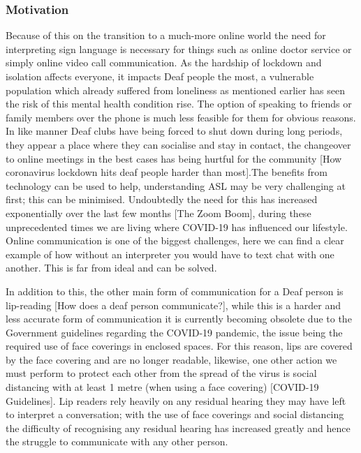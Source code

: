 \documentclass[10pt]{article}
\begin{document}
\subsubsection{Motivation}

Because of this on the transition to a much-more online world the need for interpreting sign 
language is necessary for things such as online doctor service or simply online video call 
communication. As the hardship of lockdown and isolation affects everyone, it impacts Deaf people 
the most, a vulnerable population which already suffered from loneliness as mentioned earlier has 
seen the risk of this mental health condition rise. The option of speaking to friends or family 
members over the phone is much less feasible for them for obvious reasons. In like manner Deaf clubs 
have being forced to shut down during long periods, they appear a place where they can socialise and 
stay in contact, the changeover to online meetings in the best cases has being hurtful for the 
community [How coronavirus lockdown hits deaf people harder than most].The benefits from technology 
can be used to help, understanding ASL may be very challenging at first; this can be minimised. 
Undoubtedly the need for this has increased exponentially over the last few months [The Zoom Boom], 
during these unprecedented times we are living where COVID-19 has influenced our lifestyle. Online 
communication is one of the biggest challenges, here we can find a clear example of how without an 
interpreter you would have to text chat with one another. This is far from ideal and can be solved. 

In addition to this, the other main form of communication for a Deaf person is lip-reading [How does 
a deaf person communicate?], while this is a harder and less accurate form of communication it is 
currently becoming obsolete due to the Government guidelines regarding the COVID-19 pandemic, the 
issue being the required use of face coverings in enclosed spaces. For this reason, lips are covered 
by the face covering and are no longer readable, likewise, one other action we must perform to 
protect each other from the spread of the virus is social distancing with at least 1 metre (when 
using a face covering) [COVID-19 Guidelines]. Lip readers rely heavily on any residual hearing they 
may have left to interpret a conversation; with the use of face coverings and social distancing the 
difficulty of recognising any residual hearing has increased greatly and hence the struggle to 
communicate with any other person. 
\end{document}
